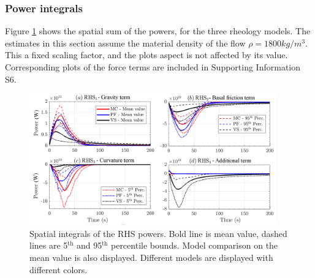 \documentclass{article}
\begin{document}
\subsubsection{Power integrals}
Figure \ref{fig:Colima-Power-spatial} shows the spatial sum of the powers, for the three rheology models. The estimates in this section assume the material density of the flow $\rho = 1800 kg/m^3$. This a fixed scaling factor, and the plots aspect is not affected by its value. Corresponding plots of the force terms are included in Supporting Information S6. 
\begin{figure}[H]
        \centering
        \includegraphics[width=0.95\textwidth]{BAF_VolcanDeColima/AveragedMeasurments/PowersColima.png}
        \caption{Spatial integrals of the RHS powers. Bold line is mean value, dashed lines are 5$^{\mathrm{th}}$ and 95$^{\mathrm{th}}$ percentile bounds. Model comparison on the mean value is also displayed. Different models are displayed with different colors.}
        \label{fig:Colima-Power-spatial}
\end{figure}
\end{document}
